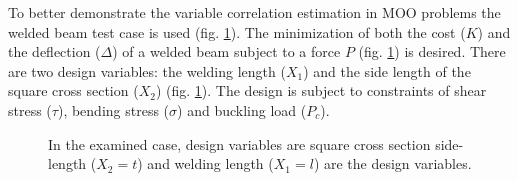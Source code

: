To better demonstrate the variable correlation estimation in MOO problems  the welded beam test case is used (fig. \ref{case}).  The minimization of both the cost ($K$) and the deflection ($\Delta$) of a welded beam subject to a force $P$ (fig. \ref{case}) is desired. There are two design variables: the welding length ($X_1$)  and the side length of the square cross section ($X_2$) (fig. \ref{case}). The design is subject to constraints of shear stress ($\tau$), bending stress ($\sigma$) and buckling load ($P_c$).    

\begin{figure}
\begin{minipage}[b]{1\linewidth}
 \centering
\end{minipage}
\caption{In the examined case, design variables are square cross section side-length ($X_2 = t$) and welding length ($X_1 = l$) are the design variables.} 
\label{case}
\end{figure}

